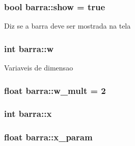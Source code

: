 \subsubsection[{\texorpdfstring{show}{show}}]{\setlength{\rightskip}{0pt plus 5cm}bool barra\+::show = true\hspace{0.3cm}{\ttfamily [private]}}\hypertarget{classbarra_a9e692d2ae2421c2d8cc591d5456790ec}{}\label{classbarra_a9e692d2ae2421c2d8cc591d5456790ec}
Diz se a barra deve ser mostrada na tela 
\subsubsection[{\texorpdfstring{w}{w}}]{\setlength{\rightskip}{0pt plus 5cm}int barra\+::w\hspace{0.3cm}{\ttfamily [private]}}\hypertarget{classbarra_a31fd53ae11742f912eb9e0b20707cb82}{}\label{classbarra_a31fd53ae11742f912eb9e0b20707cb82}
Variaveis de dimensao 
\subsubsection[{\texorpdfstring{w\+\_\+mult}{w_mult}}]{\setlength{\rightskip}{0pt plus 5cm}float barra\+::w\+\_\+mult = 2\hspace{0.3cm}{\ttfamily [private]}}\hypertarget{classbarra_a7ca620e27ef6e75eb8dfcc05a738a97c}{}\label{classbarra_a7ca620e27ef6e75eb8dfcc05a738a97c}
\subsubsection[{\texorpdfstring{x}{x}}]{\setlength{\rightskip}{0pt plus 5cm}int barra\+::x\hspace{0.3cm}{\ttfamily [private]}}\hypertarget{classbarra_a60f0c711fd29434f3fb07a3f584a83a1}{}\label{classbarra_a60f0c711fd29434f3fb07a3f584a83a1}
\subsubsection[{\texorpdfstring{x\+\_\+param}{x_param}}]{\setlength{\rightskip}{0pt plus 5cm}float barra\+::x\+\_\+param\hspace{0.3cm}{\ttfamily [private]}}\hypertarget{classbarra_af6bfdf384cdef9648b4ad8e83901308c}{}\label{classbarra_af6bfdf384cdef9648b4ad8e83901308c}
